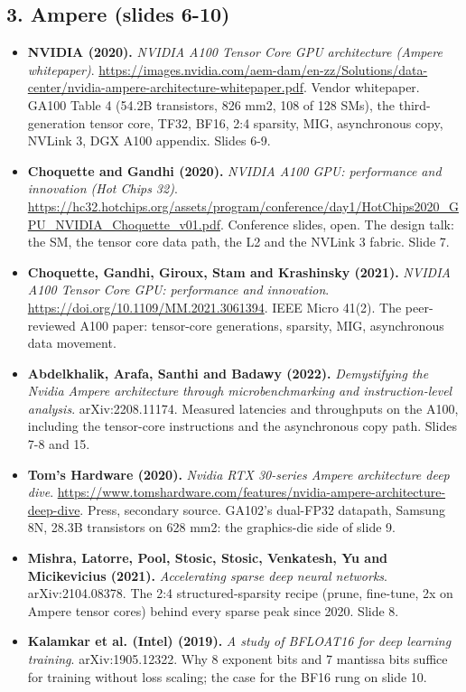 \documentclass[11pt,letterpaper]{article}
\begin{document}
\subsection*{3. Ampere (slides 6-10)}
\begin{itemize}[leftmargin=1.2em,itemsep=3pt]\sloppy
\item \textbf{NVIDIA (2020).} \textit{NVIDIA A100 Tensor Core GPU architecture (Ampere whitepaper)}. \url{https://images.nvidia.com/aem-dam/en-zz/Solutions/data-center/nvidia-ampere-architecture-whitepaper.pdf}. Vendor whitepaper. GA100 Table 4 (54.2B transistors, 826 mm2, 108 of 128 SMs), the third-generation tensor core, TF32, BF16, 2:4 sparsity, MIG, asynchronous copy, NVLink 3, DGX A100 appendix. Slides 6-9.
\item \textbf{Choquette and Gandhi (2020).} \textit{NVIDIA A100 GPU: performance and innovation (Hot Chips 32)}. \url{https://hc32.hotchips.org/assets/program/conference/day1/HotChips2020_GPU_NVIDIA_Choquette_v01.pdf}. Conference slides, open. The design talk: the SM, the tensor core data path, the L2 and the NVLink 3 fabric. Slide 7.
\item \textbf{Choquette, Gandhi, Giroux, Stam and Krashinsky (2021).} \textit{NVIDIA A100 Tensor Core GPU: performance and innovation}. \url{https://doi.org/10.1109/MM.2021.3061394}. IEEE Micro 41(2). The peer-reviewed A100 paper: tensor-core generations, sparsity, MIG, asynchronous data movement.
\item \textbf{Abdelkhalik, Arafa, Santhi and Badawy (2022).} \textit{Demystifying the Nvidia Ampere architecture through microbenchmarking and instruction-level analysis}. arXiv:2208.11174. Measured latencies and throughputs on the A100, including the tensor-core instructions and the asynchronous copy path. Slides 7-8 and 15.
\item \textbf{Tom's Hardware (2020).} \textit{Nvidia RTX 30-series Ampere architecture deep dive}. \url{https://www.tomshardware.com/features/nvidia-ampere-architecture-deep-dive}. Press, secondary source. GA102's dual-FP32 datapath, Samsung 8N, 28.3B transistors on 628 mm2: the graphics-die side of slide 9.
\item \textbf{Mishra, Latorre, Pool, Stosic, Stosic, Venkatesh, Yu and Micikevicius (2021).} \textit{Accelerating sparse deep neural networks}. arXiv:2104.08378. The 2:4 structured-sparsity recipe (prune, fine-tune, 2x on Ampere tensor cores) behind every sparse peak since 2020. Slide 8.
\item \textbf{Kalamkar et al. (Intel) (2019).} \textit{A study of BFLOAT16 for deep learning training}. arXiv:1905.12322. Why 8 exponent bits and 7 mantissa bits suffice for training without loss scaling; the case for the BF16 rung on slide 10.

\end{itemize}
\end{document}
